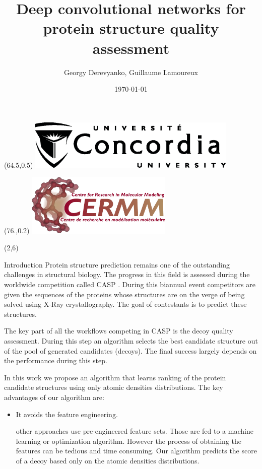 \documentclass[final, unknownkeysallowed]{beamer}
\title{Deep convolutional networks for protein structure quality assessment}
\author{Georgy Derevyanko, Guillaume Lamoureux}
\institute[CLS]{Department of Chemistry and Biochemistry and Centre for Research in Molecular Modeling (CERMM), Concordia University, Montréal, Canada}
\date{\today}
\begin{document}
\begin{frame}{}

\begin{textblock}{6}(64.5,0.5)
\includegraphics[width=10.0cm]{Logo/ConULogo_K}
\end{textblock}
\begin{textblock}{6}(76.,0.2)
\includegraphics[width=7.0cm]{Logo/CERMM_transparent.png}
\end{textblock}



\begin{textblock}{39.0}(2,6)
\begin{block}{Introduction}
Protein structure prediction remains one of the outstanding challenges in structural biology. 
The progress in this field is assessed during the worldwide competition called CASP \cite{moult2014critical}.
During this biannual event competitors are given the sequences of the proteins whose structures are 
on the verge of being solved using X-Ray crystallography. The goal of contestants is to predict these 
structures.


The key part of all the workflows competing in CASP is the decoy quality assessment.
During this step an algorithm selects the best candidate structure out of the pool of generated candidates (decoys). 
The final success largely depends on the performance during this step.

In this work we propose an algorithm that learns ranking of the protein candidate structures using 
only atomic densities distributions. The key advantages of our algorithm are:
\begin{itemize}
\item It avoids the feature engineering.

other approaches use pre-engineered feature sets. 
Those are fed to a machine learning or optimization algorithm. 
However the process of obtaining the features can be tedious and time consuming. 
Our algorithm predicts the score of a decoy based only on the atomic densities distributions.


\end{itemize}
\end{block}
\end{textblock}
\end{frame}
\end{document}
